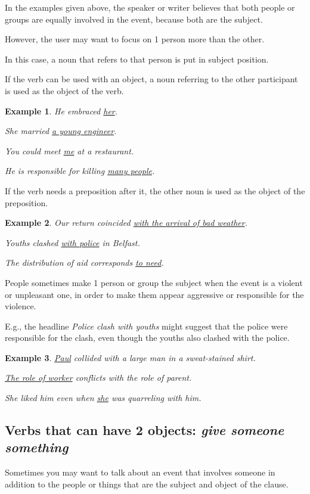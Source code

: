 \documentclass[oneside]{book}
\numberwithin{equation}{section}
\newtheorem{example}{Example}[section]
\begin{document}
%
\noindent{} In the examples given above, the speaker or writer believes that both people or groups are equally involved in the event, because both are the subject.

However, the user may want to focus on 1 person more than the other.

In this case, a noun that refers to that person is put in subject position.

%
If the verb can be used with an object, a noun referring to the other participant is used as the object of the verb.
\begin{example}
    He embraced \underline{her}.
    
    She married \underline{a young engineer}.
    
    You could meet \underline{me} at a restaurant.
    
    He is responsible for killing \underline{many people}.
\end{example}
If the verb needs a preposition after it, the other noun is used as the object of the preposition.
\begin{example}
    Our return coincided \underline{with the arrival of bad weather}.
    
    Youths clashed \underline{with police} in Belfast.
    
    The distribution of aid corresponds \underline{to need}.
\end{example}
%
\noindent{} People sometimes make 1 person or group the subject when the event is a violent or unpleasant one, in order to make them appear aggressive or responsible for the violence.

E.g., the headline \textit{Police clash with youths} might suggest that the police were responsible for the clash, even though the youths also clashed with the police.
\begin{example}
    \underline{Paul} collided with a large man in a sweat-stained shirt.
    
    \underline{The role of worker} conflicts with the role of parent.
    
    She liked him even when \underline{she} was quarreling with him.
\end{example}

\subsection{Verbs that can have 2 objects: \textit{give someone something}}
\noindent{} Sometimes you may want to talk about an event that involves someone in addition to the people or things that are the subject and object of the clause.
\end{document}
